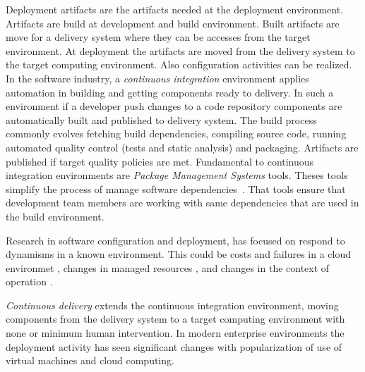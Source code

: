Deployment artifacts are the artifacts needed at the deployment environment. Artifacts are build at development and build environment. Built artifacts are move for a delivery system where they can be accesses from the target environment. At deployment the artifacts are moved from the delivery system to the target computing environment. Also configuration activities can be realized.
In the software industry, a \emph{continuous integration} environment applies automation in building and getting components ready to delivery. In such a environment if a developer push changes to a code repository components are automatically built and published to delivery system. The build process commonly evolves fetching build dependencies, compiling source code, running automated quality control (tests and static analysis) and packaging. Artifacts are published if target quality policies are met.
Fundamental to continuous integration environments are \emph{Package Management Systems} tools. Theses tools simplify the process of manage software dependencies~\cite{spinellis_package_2012}. That tools ensure that development team members are working with same dependencies that are used in the build environment.

Research in software configuration and deployment, has focused on respond to dynamisms in a known environment. This could be costs and failures in a cloud environmet \cite{ferreira_leite_user_2014}, changes in managed resources \citep{gunalp_rondo_2015}, and changes in the context of operation \cite{bencomo_dynamically_2008}.

\emph{Continuous delivery} extends the continuous integration environment, moving components from the delivery system to a target computing environment with none or minimum human intervention.
In modern enterprise environments the deployment activity has seen significant changes with popularization of use of virtual machines and cloud computing.

